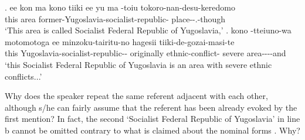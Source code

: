  \ag. ee kon ma kono tiiki ee yu ma -toiu tokoro-nan-desu-keredomo \\
 	   this area    former-Yugoslavia-socialist-republic- place--.-though \\
	`This area is called Socialist Federal Republic of Yugoslavia,'
 \bg. kono -tteiuno-wa motomotoga ee minzoku-tairitu-no hagesii tiiki-de-gozai-masi-te \\
 	this Yugoslavia-socialist-republic-- originally  ethnic-conflict- severe area----and \\
	`this Socialist Federal Republic of Yugoslavia is an area with severe ethnic conflicts...'

Why does the speaker repeat the same referent adjacent with each other,
although s/he can fairly assume that the referent has been already evoked by the first mention?
In fact, the second `Socialist Federal Republic of Yugoslavia' in line b cannot be omitted contrary to what is claimed about the nominal forms \cite{givon83,gundeletal93,ariel90}.
Why?

